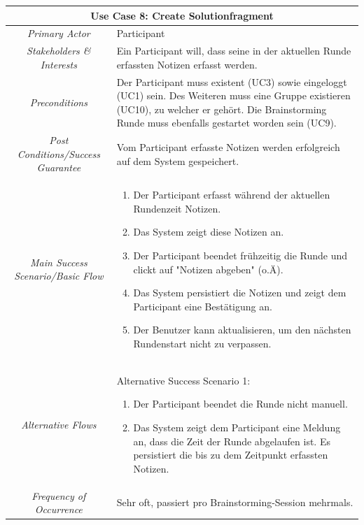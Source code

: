 \renewcommand{\arraystretch}{1.35}
\begin{center}
	\begin{longtable}{| c | p{7cm} |}
		\hline
		\multicolumn{2}{|c|}{\textbf{Use Case 8: Create Solutionfragment}}\\
		\hline\hline
		\textit{Primary Actor} & Participant\\
		\hline
		\textit{Stakeholders \& Interests} & Ein Participant will, dass seine in der aktuellen Runde erfassten Notizen erfasst werden. \\
		\hline
		\textit{Preconditions} & Der Participant muss existent (UC3) sowie eingeloggt (UC1) sein. Des Weiteren muss eine Gruppe existieren (UC10), zu welcher er gehört. Die Brainstorming Runde muss ebenfalls gestartet worden sein (UC9). \\
		\hline
		\textit{Post Conditions/Success Guarantee} & Vom Participant erfasste Notizen werden erfolgreich auf dem System gespeichert. \\
		\hline
		\textit{Main Success Scenario/Basic Flow} & 
		\begin{enumerate}[noitemsep]
			\item Der Participant erfasst während der aktuellen Rundenzeit Notizen.
			\item Das System zeigt diese Notizen an.
			\item Der Participant beendet frühzeitig die Runde und clickt auf "Notizen abgeben" (o.Ä).
			\item Das System persistiert die Notizen und zeigt dem Participant eine Bestätigung an. 
			\item Der Benutzer kann aktualisieren, um den nächsten Rundenstart nicht zu verpassen.
		\end{enumerate}\\
		\hline
		\textit{Alternative Flows} &
		Alternative	Success Scenario 1:
		\begin{enumerate}[label=3.\alph*,noitemsep]
			\item Der Participant beendet die Runde nicht manuell.
			\item Das System zeigt dem Participant eine Meldung an, dass die Zeit der Runde abgelaufen ist. Es persistiert die bis zu dem Zeitpunkt erfassten Notizen.
		\end{enumerate}\\
	
		\hline
		
		\textit{Frequency of Occurrence} & Sehr oft, passiert pro Brainstorming-Session mehrmals.\\
		
		\hline
	\end{longtable}
\end{center}


